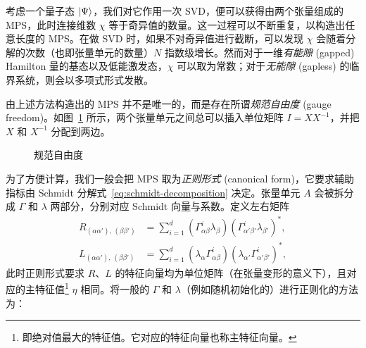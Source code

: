 考虑一个量子态 $\ket{\Psi}$，我们对它作用一次 SVD，便可以获得由两个张量组成的 MPS，此时连接维数 $\chi$ 等于奇异值的数量。这一过程可以不断重复，以构造出任意长度的 MPS。在做 SVD 时，如果不对奇异值进行截断，可以发现 $\chi$ 会随着分解的次数（也即张量单元的数量）$N$ 指数级增长。然而对于一维\emph{有能隙} (gapped) Hamilton 量的基态以及低能激发态，$\chi$ 可以取为常数；对于\emph{无能隙} (gapless) 的临界系统，则会以多项式形式发散。


由上述方法构造出的 MPS 并不是唯一的，而是存在所谓\emph{规范自由度} (gauge freedom)\cite{bridgeman2017hand}。如图~\ref{fig:mps-gauge-freedom} 所示，两个张量单元之间总可以插入单位矩阵 $I=XX^{-1}$，并把 $X$ 和 $X^{-1}$ 分配到两边。

\begin{figure}[htb]
  \centering
  \caption{规范自由度}
  \label{fig:mps-gauge-freedom}
\end{figure}

为了方便计算，我们一般会把 MPS 取为\emph{正则形式} (canonical form)\cite{orus2008infinite,schollwock2011density,orus2014practical}，它要求辅助指标由 Schmidt 分解式~\eqref{eq:schmidt-decomposition} 决定。张量单元 $A$ 会被拆分成 $\Gamma$ 和 $\lambda$ 两部分，分别对应 Schmidt 向量与系数。定义左右矩阵
\begin{equation}
  \begin{aligned}
       R_{(\alpha\alpha'), \, (\beta\beta')}
    &= \sum_{i=1}^d \left( \Gamma^i_{\alpha\beta} \lambda_\beta \right) \left( \Gamma^i_{\alpha'\beta'} \lambda_{\beta'} \right)^*, \\
       L_{(\alpha\alpha'), \, (\beta\beta')}
    &= \sum_{i=1}^d \left( \lambda_\alpha \Gamma^i_{\alpha\beta} \right) \left( \lambda_{\alpha'} \Gamma^i_{\alpha'\beta'} \right)^*,
  \end{aligned}
\end{equation}
此时正则形式要求 $R$、$L$ 的特征向量均为单位矩阵（在张量变形的意义下），且对应的主特征值\footnote{即绝对值最大的特征值。它对应的特征向量也称主特征向量。} $\eta$ 相同。将一般的 $\Gamma$ 和 $\lambda$（例如随机初始化的）进行正则化的方法为：

